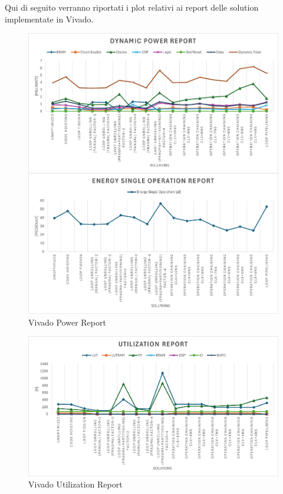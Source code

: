Qui di seguito verranno riportati i plot relativi ai report delle solution implementate in Vivado.

\begin{figure}[H]
    \centering
    \includegraphics[width=0.7\textheight]{conclusions/powerreport.png}
    \caption{Vivado Power Report}
    \label{fig:vivado-power-report}
\end{figure}

\begin{figure}[H]
	\centering
	\includegraphics[width=0.7\textheight]{conclusions/utilization.png}
	\caption{Vivado Utilization Report}
	\label{fig:vivado-utilization-report}
\end{figure}


